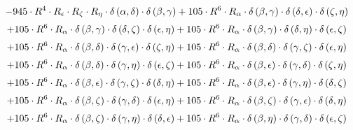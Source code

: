 \begin{subequations}
\begin{gather}
 \\[0.2em] \notag 		 - 945 \cdot R^{4} \cdot R_{\epsilon{}} \cdot R_{\zeta{}} \cdot R_{\eta{}} \cdot \delta{}\left(\alpha{}, \delta{}\right) \cdot \delta{}\left(\beta{}, \gamma{}\right)+ 105 \cdot R^{6} \cdot R_{\alpha{}} \cdot \delta{}\left(\beta{}, \gamma{}\right) \cdot \delta{}\left(\delta{}, \epsilon{}\right) \cdot \delta{}\left(\zeta{}, \eta{}\right) 
 \\[0.2em] \notag 		 + 105 \cdot R^{6} \cdot R_{\alpha{}} \cdot \delta{}\left(\beta{}, \gamma{}\right) \cdot \delta{}\left(\delta{}, \zeta{}\right) \cdot \delta{}\left(\epsilon{}, \eta{}\right)+ 105 \cdot R^{6} \cdot R_{\alpha{}} \cdot \delta{}\left(\beta{}, \gamma{}\right) \cdot \delta{}\left(\delta{}, \eta{}\right) \cdot \delta{}\left(\epsilon{}, \zeta{}\right) 
 \\[0.2em] \notag 		 + 105 \cdot R^{6} \cdot R_{\alpha{}} \cdot \delta{}\left(\beta{}, \delta{}\right) \cdot \delta{}\left(\gamma{}, \epsilon{}\right) \cdot \delta{}\left(\zeta{}, \eta{}\right)+ 105 \cdot R^{6} \cdot R_{\alpha{}} \cdot \delta{}\left(\beta{}, \delta{}\right) \cdot \delta{}\left(\gamma{}, \zeta{}\right) \cdot \delta{}\left(\epsilon{}, \eta{}\right) 
 \\[0.2em] \notag 		 + 105 \cdot R^{6} \cdot R_{\alpha{}} \cdot \delta{}\left(\beta{}, \delta{}\right) \cdot \delta{}\left(\gamma{}, \eta{}\right) \cdot \delta{}\left(\epsilon{}, \zeta{}\right)+ 105 \cdot R^{6} \cdot R_{\alpha{}} \cdot \delta{}\left(\beta{}, \epsilon{}\right) \cdot \delta{}\left(\gamma{}, \delta{}\right) \cdot \delta{}\left(\zeta{}, \eta{}\right) 
 \\[0.2em] \notag 		 + 105 \cdot R^{6} \cdot R_{\alpha{}} \cdot \delta{}\left(\beta{}, \epsilon{}\right) \cdot \delta{}\left(\gamma{}, \zeta{}\right) \cdot \delta{}\left(\delta{}, \eta{}\right)+ 105 \cdot R^{6} \cdot R_{\alpha{}} \cdot \delta{}\left(\beta{}, \epsilon{}\right) \cdot \delta{}\left(\gamma{}, \eta{}\right) \cdot \delta{}\left(\delta{}, \zeta{}\right) 
 \\[0.2em] \notag 		 + 105 \cdot R^{6} \cdot R_{\alpha{}} \cdot \delta{}\left(\beta{}, \zeta{}\right) \cdot \delta{}\left(\gamma{}, \delta{}\right) \cdot \delta{}\left(\epsilon{}, \eta{}\right)+ 105 \cdot R^{6} \cdot R_{\alpha{}} \cdot \delta{}\left(\beta{}, \zeta{}\right) \cdot \delta{}\left(\gamma{}, \epsilon{}\right) \cdot \delta{}\left(\delta{}, \eta{}\right) 
 \\[0.2em] \notag 		 + 105 \cdot R^{6} \cdot R_{\alpha{}} \cdot \delta{}\left(\beta{}, \zeta{}\right) \cdot \delta{}\left(\gamma{}, \eta{}\right) \cdot \delta{}\left(\delta{}, \epsilon{}\right)+ 105 \cdot R^{6} \cdot R_{\alpha{}} \cdot \delta{}\left(\beta{}, \eta{}\right) \cdot \delta{}\left(\gamma{}, \delta{}\right) \cdot \delta{}\left(\epsilon{}, \zeta{}\right) 

\end{gather}
\end{subequations}
